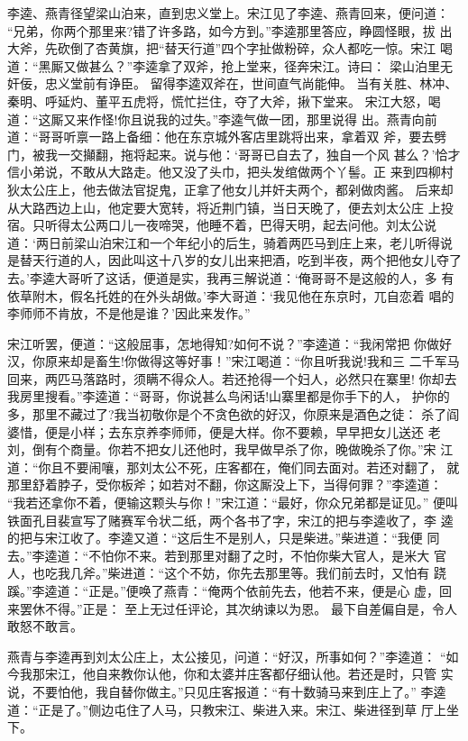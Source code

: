 李逵、燕青径望梁山泊来，直到忠义堂上。宋江见了李逵、燕青回来，便问道：
“兄弟，你两个那里来?错了许多路，如今方到。”李逵那里答应，睁圆怪眼，拔
出大斧，先砍倒了杏黄旗，把“替天行道”四个字扯做粉碎，众人都吃一惊。宋江
喝道：“黑厮又做甚么？”李逵拿了双斧，抢上堂来，径奔宋江。诗曰：
梁山泊里无奸佞，忠义堂前有诤臣。
留得李逵双斧在，世间直气尚能伸。
当有关胜、林冲、秦明、呼延灼、董平五虎将，慌忙拦住，夺了大斧，揪下堂来。
宋江大怒，喝道：“这厮又来作怪!你且说我的过失。”李逵气做一团，那里说得
出。燕青向前道：“哥哥听禀一路上备细：他在东京城外客店里跳将出来，拿着双
斧，要去劈门，被我一交攧翻，拖将起来。说与他：‘哥哥已自去了，独自一个风
甚么？’恰才信小弟说，不敢从大路走。他又没了头巾，把头发绾做两个丫髻。正
来到四柳村狄太公庄上，他去做法官捉鬼，正拿了他女儿并奸夫两个，都剁做肉酱。
后来却从大路西边上山，他定要大宽转，将近荆门镇，当日天晚了，便去刘太公庄
上投宿。只听得太公两口儿一夜啼哭，他睡不着，巴得天明，起去问他。刘太公说
道：‘两日前梁山泊宋江和一个年纪小的后生，骑着两匹马到庄上来，老儿听得说
是替天行道的人，因此叫这十八岁的女儿出来把酒，吃到半夜，两个把他女儿夺了
去。’李逵大哥听了这话，便道是实，我再三解说道：‘俺哥哥不是这般的人，多
有依草附木，假名托姓的在外头胡做。’李大哥道：‘我见他在东京时，兀自恋着
唱的李师师不肯放，不是他是谁？’因此来发作。”

宋江听罢，便道：“这般屈事，怎地得知?如何不说？”李逵道：“我闲常把
你做好汉，你原来却是畜生!你做得这等好事！”宋江喝道：“你且听我说!我和三
二千军马回来，两匹马落路时，须瞒不得众人。若还抢得一个妇人，必然只在寨里!
你却去我房里搜看。”李逵道：“哥哥，你说甚么鸟闲话!山寨里都是你手下的人，
护你的多，那里不藏过了?我当初敬你是个不贪色欲的好汉，你原来是酒色之徒：
杀了阎婆惜，便是小样；去东京养李师师，便是大样。你不要赖，早早把女儿送还
老刘，倒有个商量。你若不把女儿还他时，我早做早杀了你，晚做晚杀了你。”宋
江道：“你且不要闹嚷，那刘太公不死，庄客都在，俺们同去面对。若还对翻了，
就那里舒着脖子，受你板斧；如若对不翻，你这厮没上下，当得何罪？”李逵道：
“我若还拿你不着，便输这颗头与你！”宋江道：“最好，你众兄弟都是证见。”
便叫铁面孔目裴宣写了赌赛军令状二纸，两个各书了字，宋江的把与李逵收了，李
逵的把与宋江收了。李逵又道：“这后生不是别人，只是柴进。”柴进道：“我便
同去。”李逵道：“不怕你不来。若到那里对翻了之时，不怕你柴大官人，是米大
官人，也吃我几斧。”柴进道：“这个不妨，你先去那里等。我们前去时，又怕有
跷蹊。”李逵道：“正是。”便唤了燕青：“俺两个依前先去，他若不来，便是心
虚，回来罢休不得。”正是：
至上无过任评论，其次纳谏以为恩。
最下自差偏自是，令人敢怒不敢言。

燕青与李逵再到刘太公庄上，太公接见，问道：“好汉，所事如何？”李逵道：
“如今我那宋江，他自来教你认他，你和太婆并庄客都仔细认他。若还是时，只管
实说，不要怕他，我自替你做主。”只见庄客报道：“有十数骑马来到庄上了。”
李逵道：“正是了。”侧边屯住了人马，只教宋江、柴进入来。宋江、柴进径到草
厅上坐下。

